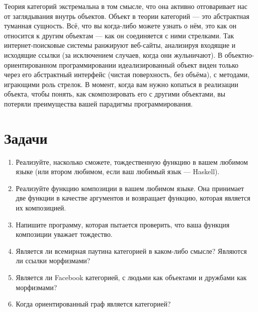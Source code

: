 Теория категорий экстремальна в том смысле, что она активно отговаривает нас
от заглядывания внутрь объектов. Объект в теории категорий --- это
абстрактная туманная сущность. Всё, что вы когда-либо можете узнать о нём, это как он
относится к другим объектам --- как он соединяется с ними стрелками. Так
интернет-поисковые системы ранжируют веб-сайты, анализируя входящие и
исходящие ссылки (за исключением случаев, когда они жульничают). В объектно-ориентированном программировании
идеализированный объект виден только через его абстрактный интерфейс (чистая
поверхность, без объёма), с методами, играющими роль стрелок. В момент,
когда вам нужно копаться в реализации объекта, чтобы
понять, как скомпозировать его с другими объектами, вы потеряли
преимущества вашей парадигмы программирования.

\section{Задачи}

\begin{enumerate}
  \tightlist
  \item
        Реализуйте, насколько сможете, тождественную функцию в вашем любимом
        языке (или втором любимом, если ваш любимый язык ---
        Haskell).
  \item
        Реализуйте функцию композиции в вашем любимом языке. Она принимает
        две функции в качестве аргументов и возвращает функцию, которая является их
        композицией.
  \item
        Напишите программу, которая пытается проверить, что ваша функция композиции
        уважает тождество.
  \item
        Является ли всемирная паутина категорией в каком-либо смысле? Являются ли ссылки морфизмами?
  \item
        Является ли Facebook категорией, с людьми как объектами и дружбами как
        морфизмами?
  \item
        Когда ориентированный граф является категорией?
\end{enumerate}
